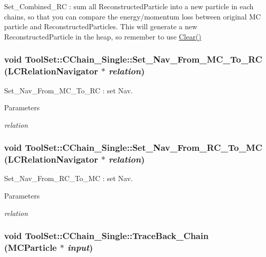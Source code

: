 Set\_\-Combined\_\-RC : sum all ReconstructedParticle into a new particle in each chains, so that you can compare the energy/momentum loss between original MC particle and ReconstructedParticles. This will generate a new ReconstructedParticle in the heap, so remember to use \hyperlink{classToolSet_1_1CChain__Single_ae991aff7b553d31f4073eb5aaf0e0440}{Clear()} \hypertarget{classToolSet_1_1CChain__Single_ad0af64f3a95dea5a7205a03a0b5c6b2d}{
\subsubsection[{Set\_\-Nav\_\-From\_\-MC\_\-To\_\-RC}]{\setlength{\rightskip}{0pt plus 5cm}void ToolSet::CChain\_\-Single::Set\_\-Nav\_\-From\_\-MC\_\-To\_\-RC (LCRelationNavigator $\ast$ {\em relation})}}
\label{classToolSet_1_1CChain__Single_ad0af64f3a95dea5a7205a03a0b5c6b2d}


Set\_\-Nav\_\-From\_\-MC\_\-To\_\-RC : set Nav. 
\begin{DoxyParams}{Parameters}
\item[{\em relation}]\end{DoxyParams}
\hypertarget{classToolSet_1_1CChain__Single_ad2311e70909778460c342a2b93387db6}{
\subsubsection[{Set\_\-Nav\_\-From\_\-RC\_\-To\_\-MC}]{\setlength{\rightskip}{0pt plus 5cm}void ToolSet::CChain\_\-Single::Set\_\-Nav\_\-From\_\-RC\_\-To\_\-MC (LCRelationNavigator $\ast$ {\em relation})}}
\label{classToolSet_1_1CChain__Single_ad2311e70909778460c342a2b93387db6}


Set\_\-Nav\_\-From\_\-RC\_\-To\_\-MC : set Nav. 
\begin{DoxyParams}{Parameters}
\item[{\em relation}]\end{DoxyParams}
\hypertarget{classToolSet_1_1CChain__Single_a8f0623cb1122dc17a82f3b86289b9681}{
\subsubsection[{TraceBack\_\-Chain}]{\setlength{\rightskip}{0pt plus 5cm}void ToolSet::CChain\_\-Single::TraceBack\_\-Chain (MCParticle $\ast$ {\em input})}}
\label{classToolSet_1_1CChain__Single_a8f0623cb1122dc17a82f3b86289b9681}


